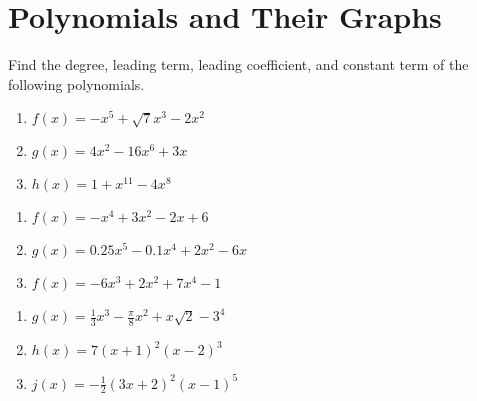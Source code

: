 \chapter{Polynomials and Their Graphs}

Find the degree, leading term, leading coefficient, and constant term of the following polynomials.
\begin{multicols}{3}
\begin{enumerate}
\item $f(x) = -x^5 + \sqrt{7}x^3 - 2x^2$
\item $g(x) = 4x^2 - 16x^6 + 3x$
\item $h(x) = 1 + x^{11} - 4x^8$
\end{enumerate}	\setcounter{Review}{\value{enumi}}
\end{multicols}
\begin{multicols}{3}
\begin{enumerate}	\setcounter{enumi}{\value{Review}} 
\item $f(x) = -x^4+3x^2-2x+6$
\item $g(x) = 0.25x^5-0.1x^4+2x^2-6x$
\item $f(x) = -6x^3 + 2x^2 + 7x^4 - 1$
\end{enumerate}	\setcounter{Review}{\value{enumi}}
\end{multicols}
\begin{multicols}{3}
\begin{enumerate}	\setcounter{enumi}{\value{Review}} 
\item $g(x) = \frac{1}{3}x^3 - \frac{\pi}{8}x^2 + x\sqrt{2} - 3^4$
\item $h(x) = 7(x+1)^2(x-2)^3$
\item $j(x) = -\frac{1}{2}\left(3x+2\right)^2(x-1)^5$
\end{enumerate}		\setcounter{Review}{\value{enumi}}
\end{multicols}
\bigskip

